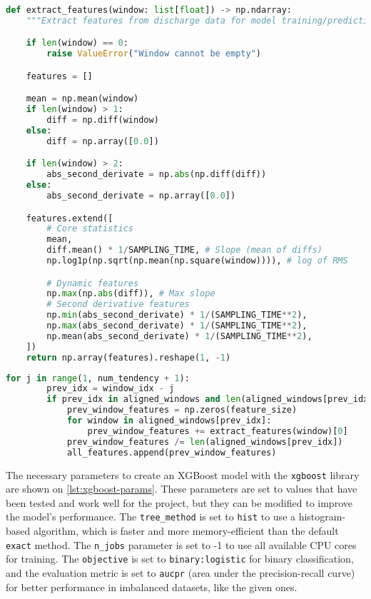 \begin{lstlisting}[language=Python, caption={XGBoost feature extraction for the current window}, label={lst:xgboost-features}]
def extract_features(window: list[float]) -> np.ndarray:
    """Extract features from discharge data for model training/prediction"""

    if len(window) == 0:
        raise ValueError("Window cannot be empty")

    features = []

    mean = np.mean(window)
    if len(window) > 1:
        diff = np.diff(window)
    else:
        diff = np.array([0.0])

    if len(window) > 2:
        abs_second_derivate = np.abs(np.diff(diff))
    else:
        abs_second_derivate = np.array([0.0])

    features.extend([
        # Core statistics
        mean,
        diff.mean() * 1/SAMPLING_TIME, # Slope (mean of diffs) 
        np.log1p(np.sqrt(np.mean(np.square(window)))), # log of RMS

        # Dynamic features
        np.max(np.abs(diff)), # Max slope
        # Second derivative features
        np.min(abs_second_derivate) * 1/(SAMPLING_TIME**2),
        np.max(abs_second_derivate) * 1/(SAMPLING_TIME**2),
        np.mean(abs_second_derivate) * 1/(SAMPLING_TIME**2),
    ])
    return np.array(features).reshape(1, -1)
\end{lstlisting}

\begin{lstlisting}[language=Python, caption={XGBoost feature extraction for the past windows}, label={lst:xgboost-past-features}]
    for j in range(1, num_tendency + 1):
        prev_idx = window_idx - j
        if prev_idx in aligned_windows and len(aligned_windows[prev_idx]) > 0:
            prev_window_features = np.zeros(feature_size)
            for window in aligned_windows[prev_idx]:
                prev_window_features += extract_features(window)[0]
            prev_window_features /= len(aligned_windows[prev_idx])
            all_features.append(prev_window_features)
\end{lstlisting}

The necessary parameters to create an XGBoost model with the \texttt{xgboost} library are shown on \autoref{lst:xgboost-params}. These parameters are set to values that have been tested and work well for the project, but they can be modified to improve the model's performance. The \texttt{tree\_method} is set to \texttt{hist} to use a histogram-based algorithm, which is faster and more memory-efficient than the default \texttt{exact} method. The \texttt{n\_jobs} parameter is set to -1 to use all available CPU cores for training. The \texttt{objective} is set to \texttt{binary:logistic} for binary classification, and the evaluation metric is set to \texttt{aucpr} (area under the precision-recall curve) for better performance in imbalanced datasets, like the given ones.

